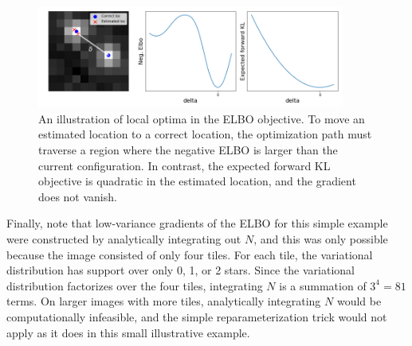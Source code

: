 \begin{figure}[!htb]
    \centering
    \includegraphics[width=0.9\textwidth]{figures/elbo_vs_sleep/local_minima_cartoon.png}
    \vspace{-0.5cm}
    \caption{An illustration of local optima in the ELBO objective.
    To move an estimated location to a correct location,
    the optimization path must traverse a region where the negative ELBO is larger than the current configuration.
    In contrast, the expected forward KL objective is quadratic in the estimated location,
    and the gradient does not vanish. }
    \label{fig:local_optima_cartoon}
\end{figure}

Finally, note that low-variance gradients of the ELBO for this simple example were constructed by analytically integrating out $N$, 
and this was only possible because the image consisted of only four tiles. 
For each tile, the variational distribution has support over only 0, 1, or 2 stars.
Since the variational distribution factorizes over the four tiles, integrating $N$ is a summation of $3^4 = 81$ terms.
On larger images with more tiles, analytically integrating $N$ would be computationally infeasible,
and the simple reparameterization trick would not apply as it does in this small illustrative example.





